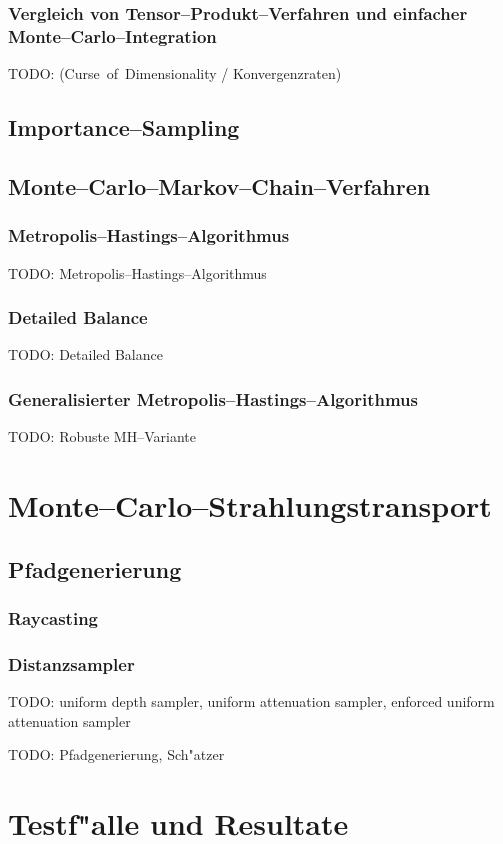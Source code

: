 \documentclass[11pt,a4paper,DIVcalc,BCOR8mm,titlepage,twoside]{scrartcl}
\begin{document}
	\subsubsection{Vergleich von Tensor--Produkt--Verfahren und einfacher Monte--Carlo--Integration}\label{subsec:integrationsproblem_comparison}
	TODO: (Curse~of~Dimensionality / Konvergenzraten)
	\subsection{Importance--Sampling}

	\subsection{Monte--Carlo--Markov--Chain--Verfahren}
	\subsubsection{Metropolis--Hastings--Algorithmus}
	TODO: Metropolis--Hastings--Algorithmus
	\subsubsection{Detailed Balance}
	TODO: Detailed Balance
	\subsubsection{Generalisierter Metropolis--Hastings--Algorithmus}
	TODO: Robuste MH--Variante

	\section{Monte--Carlo--Strahlungstransport}
	\subsection{Pfadgenerierung}
	\subsubsection{Raycasting}
	\subsubsection{Distanzsampler}
	TODO: uniform depth sampler, uniform attenuation sampler, enforced uniform attenuation sampler
	
	TODO: Pfadgenerierung, Sch"atzer
	
	\section{Testf"alle und Resultate}
\end{document}
